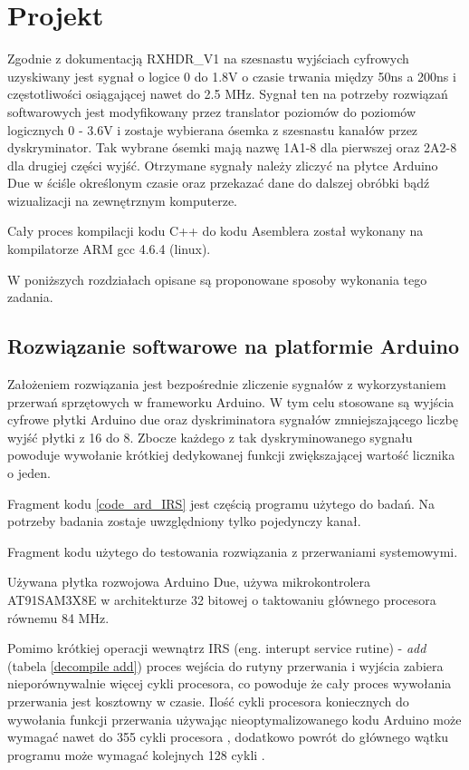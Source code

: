 \section{Projekt}

Zgodnie z dokumentacją RXHDR\_V1 \cite{master} na szesnastu wyjściach cyfrowych uzyskiwany jest sygnał o logice 0 do 1.8V o czasie trwania między 50ns a 200ns i częstotliwości osiągającej nawet do 2.5 MHz.
Sygnał ten na potrzeby rozwiązań softwarowych jest modyfikowany przez translator poziomów do poziomów logicznych 0 - 3.6V i zostaje wybierana ósemka z szesnastu kanałów przez dyskryminator.   
Tak wybrane ósemki mają nazwę 1A1-8 dla pierwszej oraz 2A2-8 dla drugiej części wyjść.   
Otrzymane sygnały należy zliczyć na płytce Arduino Due w ściśle określonym czasie oraz przekazać dane do dalszej obróbki bądź wizualizacji na zewnętrznym komputerze.

Cały proces kompilacji kodu C++ do kodu Asemblera został wykonany na kompilatorze ARM gcc 4.6.4 (linux). 

W poniższych rozdziałach opisane są proponowane sposoby wykonania tego zadania. 

\subsection{Rozwiązanie softwarowe na platformie Arduino}
\label{dzial arduino}
Założeniem rozwiązania jest bezpośrednie zliczenie sygnałów z wykorzystaniem przerwań sprzętowych w frameworku Arduino. W tym celu stosowane są wyjścia cyfrowe płytki Arduino due oraz dyskriminatora sygnałów zmniejszającego liczbę wyjść płytki z 16 do 8.
Zbocze każdego z tak dyskryminowanego sygnału  powoduje wywołanie krótkiej dedykowanej funkcji zwiększającej wartość licznika o jeden. 

Fragment kodu \ref{code_ard_IRS} jest częścią programu użytego do badań. Na potrzeby badania zostaje uwzględniony tylko pojedynczy kanał.

\begin{kod}
        
        \caption{Fragment kodu użytego do testowania rozwiązania z przerwaniami systemowymi.}
        \label{code_ard_IRS}
\end{kod}


Używana płytka rozwojowa Arduino Due, używa mikrokontrolera AT91SAM3X8E w architekturze 32 bitowej o taktowaniu głównego procesora równemu 84 MHz.

Pomimo krótkiej operacji wewnątrz IRS (eng. interupt service rutine) - \textit{add} (tabela \ref{decompile add}) proces wejścia do rutyny przerwania i wyjścia zabiera nieporównywalnie więcej cykli procesora, co powoduje że cały proces wywołania przerwania jest kosztowny w czasie. 
Ilość cykli procesora koniecznych do wywołania funkcji przerwania używając nieoptymalizowanego kodu Arduino może wymagać nawet do 355 cykli procesora \cite{ard_opt_git}, dodatkowo powrót do głównego wątku programu może wymagać kolejnych 128 cykli \cite{ard_opt_git}.

